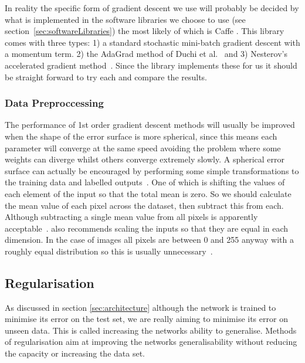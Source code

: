 \documentclass[11pt]{article} %
\begin{document}
In reality the specific form of gradient descent we use will probably be decided by what is implemented in the software libraries we choose to use (see section~\ref{sec:softwareLibraries}) the most likely of which is Caffe \cite{Jia2014}. This library comes with three types: 1) a standard stochastic mini-batch gradient descent with a momentum term. 2) the AdaGrad method of Duchi et al.~\cite{Duchi2011} and 3) Nesterov’s accelerated gradient  method~\cite{Nesterov1983,Sutskever2013a}. Since the library implements these for us it should be  straight forward to try each and compare the results.

\subsubsection{Data Preproccessing}

The performance of 1st order gradient descent methods will usually be improved when the shape of the error surface is more spherical, since this means each parameter will converge at the same speed avoiding the problem where some weights can diverge whilst others converge extremely slowly. A spherical error surface can actually be encouraged by performing some simple transformations to the training data and labelled outputs~\cite{LeCun1998a,Bottou2012}. One of which is shifting the values of each element of the input so that the total mean is zero. So we should calculate the mean value of each pixel across the dataset, then subtract this from each. Although subtracting a single mean value from all pixels is apparently acceptable~\cite{KarLects}. \cite{LeCun1998a} also recommends scaling the inputs so that they are equal in each dimension. In the case of images all pixels are between 0 and 255 anyway with a roughly equal distribution so this is usually unnecessary~\cite{KarLects}.


\subsection{Regularisation}
\label{sec:regularisation}

As discussed in section \ref{sec:architecture} although the network is trained to minimise its error on the test set, we are really aiming to minimise its error on unseen data. This is called increasing the networks ability to generalise. Methods of regularisation aim at improving the networks generalisability without reducing the capacity or increasing the data set. 
\end{document}

